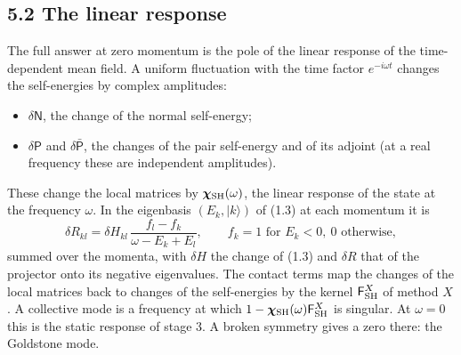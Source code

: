 \documentclass[
  10pt,
]{article}
\providecommand{\tightlist}{%
  \setlength{\itemsep}{0pt}\setlength{\parskip}{0pt}}
\begin{document}
\hypertarget{the-linear-response}{%
\subsection{5.2 The linear response}\label{the-linear-response}}

The full answer at zero momentum is the pole of the linear response of
the time-dependent mean field. A uniform fluctuation with the time
factor \(e^{-i\omega t}\) changes the self-energies by complex
amplitudes:

\begin{itemize}
\tightlist
\item
  \(\delta\mathsf N\), the change of the normal self-energy;
\item
  \(\delta\mathsf P\) and \(\delta\bar{\mathsf P}\), the changes of the
  pair self-energy and of its adjoint (at a real frequency these are
  independent amplitudes).
\end{itemize}

These change the local matrices by \(\boldsymbol\chi_{\rm SH}(\omega)\),
the linear response of the state at the frequency \(\omega\). In the
eigenbasis \((E_k,\lvert k\rangle)\) of (1.3) at each momentum it is
\[\delta R_{kl}=\delta H_{kl}\,\frac{f_l-f_k}{\omega-E_k+E_l},\qquad f_k=1\text{ for }E_k<0,\ 0\text{ otherwise},\tag{5.2}\]
summed over the momenta, with \(\delta H\) the change of (1.3) and
\(\delta R\) that of the projector onto its negative eigenvalues. The
contact terms map the changes of the local matrices back to changes of
the self-energies by the kernel \(\mathsf F^X_{\rm SH}\) of method
\(X\). A collective mode is a frequency at which
\(1-\boldsymbol\chi_{\rm SH}(\omega)\mathsf F^X_{\rm SH}\) is singular.
At \(\omega=0\) this is the static response of stage 3. A broken
symmetry gives a zero there: the Goldstone mode.
\end{document}

